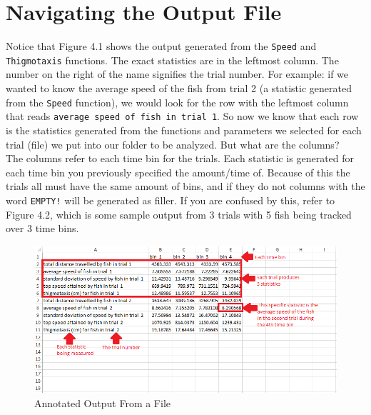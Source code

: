 \documentclass[12pt,titlepage]{report}
\begin{document}
\section{Navigating the Output File}
Notice that Figure 4.1 shows the output generated from the \texttt{Speed} and \texttt{Thigmotaxis} functions. The exact statistics are in the leftmost column. The number on the right of the name signifies the trial number. For example: if we wanted to know the average speed of the fish from trial 2 (a statistic generated from the \texttt{Speed} function), we would look for the row with the leftmost column that reads \texttt{average speed of fish in trial  1}.
So now we know that each row is the statistics generated from the functions and parameters we selected for each trial (file) we put into our folder to be analyzed. But what are the columns? 
\\  
The columns refer to each time bin for the trials. Each statistic is generated for each time bin you previously specified the amount/time of. Because of this the trials all must have the same amount of bins, and if they do not columns with the word \texttt{EMPTY!} will be generated as filler. If you are confused by this, refer to Figure 4.2, which is some sample output from 3 trials with 5 fish being tracked over 3 time bins. 
\begin{figure}[ht!]
\centering
\includegraphics[width=150mm]{image9.png}
\caption{Annotated Output From a File}
\label{overflow}
\end{figure}
\end{document}
